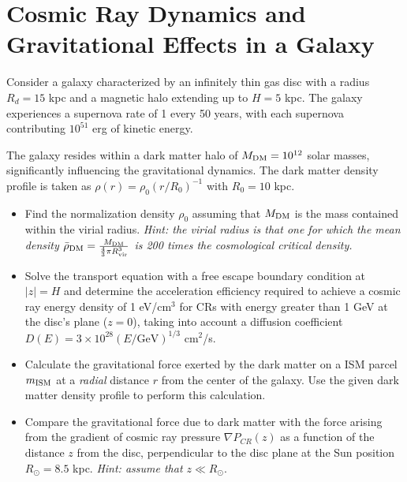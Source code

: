 \section{Cosmic Ray Dynamics and Gravitational Effects in a Galaxy}

Consider a galaxy characterized by an infinitely thin gas disc with a radius \(R_d = 15\) kpc and a magnetic halo extending up to \(H = 5\) kpc. The galaxy experiences a supernova rate of 1 every 50 years, with each supernova contributing \(10^{51}\) erg of kinetic energy. 

The galaxy resides within a dark matter halo of \(M_{\rm DM} = 10^{12}\) solar masses, significantly influencing the gravitational dynamics. The dark matter density profile is taken as \(\rho(r) = \rho_0 (r / R_0)^{-1}\) with \(R_0 = 10 \) kpc.  

\begin{itemize}
\item Find the normalization density \( \rho_0 \) assuming that  \( M_{\rm DM} \) is the mass contained within the virial radius. \emph{Hint:  the virial radius is that one for which the mean density $\bar \rho_{\rm DM} = \frac{M_{\rm DM}}{\frac{4}{3} \pi R_{\rm vir}^3}$ is 200 times the cosmological critical density.}

\item Solve the transport equation with a free escape boundary condition at \(|z| = H\) and determine the acceleration efficiency required to achieve a cosmic ray energy density of 1 eV/cm\(^3\) for CRs with energy greater than 1 GeV at the disc's plane (\(z = 0\)), taking into account a diffusion coefficient \(D(E) = 3 \times 10^{28} (E / \text{GeV})^{1/3}\) cm\(^2\)/s. 

\item Calculate the gravitational force exerted by the dark matter on a ISM parcel $m_{\rm ISM}$ at a \emph{radial} distance \( r \) from the center of the galaxy. Use the given dark matter density profile to perform this calculation.

\item Compare the gravitational force due to dark matter with the force arising from the gradient of cosmic ray pressure \(\nabla P_{CR}(z)\) as a function of the distance \(z\) from the disc, perpendicular to the disc plane at the Sun position \( R_\odot = 8.5 \) kpc. \emph{Hint: assume that \( z \ll R_\odot \)}.

\end{itemize}

